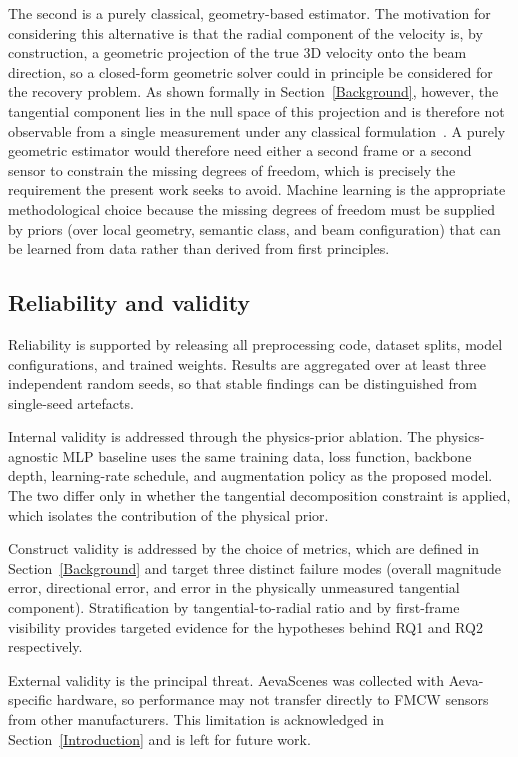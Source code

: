\documentclass[a4paper,12pt]{article}
\begin{document}
The second is a purely classical, geometry-based estimator. The motivation for considering this alternative is that the radial component of the velocity is, by construction, a geometric projection of the true 3D velocity onto the beam direction, so a closed-form geometric solver could in principle be considered for the recovery problem. As shown formally in Section~\ref{Background}, however, the tangential component lies in the null space of this projection and is therefore not observable from a single measurement under any classical formulation~\cite{yoon2023needforspeed}. A purely geometric estimator would therefore need either a second frame or a second sensor to constrain the missing degrees of freedom, which is precisely the requirement the present work seeks to avoid. Machine learning is the appropriate methodological choice because the missing degrees of freedom must be supplied by priors (over local geometry, semantic class, and beam configuration) that can be learned from data rather than derived from first principles.

\subsection{Reliability and validity}

Reliability is supported by releasing all preprocessing code, dataset splits, model configurations, and trained weights. Results are aggregated over at least three independent random seeds, so that stable findings can be distinguished from single-seed artefacts.

Internal validity is addressed through the physics-prior ablation. The physics-agnostic MLP baseline uses the same training data, loss function, backbone depth, learning-rate schedule, and augmentation policy as the proposed model. The two differ only in whether the tangential decomposition constraint is applied, which isolates the contribution of the physical prior.

Construct validity is addressed by the choice of metrics, which are defined in Section~\ref{Background} and target three distinct failure modes (overall magnitude error, directional error, and error in the physically unmeasured tangential component). Stratification by tangential-to-radial ratio and by first-frame visibility provides targeted evidence for the hypotheses behind RQ1 and RQ2 respectively.

External validity is the principal threat. AevaScenes was collected with Aeva-specific hardware, so performance may not transfer directly to FMCW sensors from other manufacturers. This limitation is acknowledged in Section~\ref{Introduction} and is left for future work.
\end{document}
